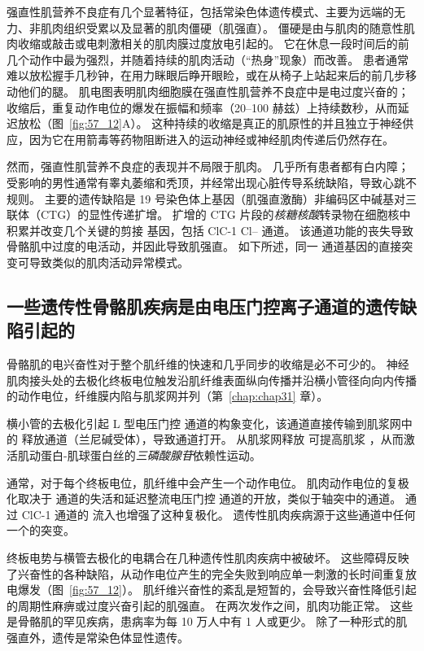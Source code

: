 强直性肌营养不良症有几个显著特征，包括常染色体遗传模式、主要为远端的无力、非肌肉组织受累以及显著的肌肉僵硬（肌强直）。
僵硬是由与肌肉的随意性肌肉收缩或敲击或电刺激相关的肌肉膜过度放电引起的。
它在休息一段时间后的前几个动作中最为强烈，并随着持续的肌肉活动（“热身”现象）而改善。
患者通常难以放松握手几秒钟，在用力眯眼后睁开眼睑，或在从椅子上站起来后的前几步移动他们的腿。
肌电图表明肌肉细胞膜在强直性肌营养不良症中是电过度兴奋的；
收缩后，重复动作电位的爆发在振幅和频率（20–100 赫兹）上持续数秒，从而延迟放松（图~\ref{fig:57_12}A）。
这种持续的收缩是真正的肌原性的并且独立于神经供应，因为它在用箭毒等药物阻断进入的运动神经或神经肌肉传递后仍然存在。


然而，强直性肌营养不良症的表现并不局限于肌肉。
几乎所有患者都有白内障；
受影响的男性通常有睾丸萎缩和秃顶，并经常出现心脏传导系统缺陷，导致心跳不规则。
主要的遗传缺陷是 19 号染色体上基因（肌强直激酶）非编码区中碱基对三联体（CTG）的显性传递扩增。
扩增的 CTG 片段的\textit{核糖核酸}转录物在细胞核中积累并改变几个关键的剪接 基因，包括 ClC-1 Cl– 通道。
该通道功能的丧失导致骨骼肌中过度的电活动，并因此导致肌强直。
如下所述，同一  通道基因的直接突变可导致类似的肌肉活动异常模式。



\subsection{一些遗传性骨骼肌疾病是由电压门控离子通道的遗传缺陷引起的}

骨骼肌的电兴奋性对于整个肌纤维的快速和几乎同步的收缩是必不可少的。
神经肌肉接头处的去极化终板电位触发沿肌纤维表面纵向传播并沿横小管径向向内传播的动作电位，纤维膜内陷与肌浆网并列（第~\ref{chap:chap31} 章）。


横小管的去极化引起 L 型电压门控  通道的构象变化，该通道直接传输到肌浆网中的  释放通道（兰尼碱受体），导致通道打开。
从肌浆网释放  可提高肌浆 ，从而激活肌动蛋白-肌球蛋白丝的\textit{三磷酸腺苷}依赖性运动。


通常，对于每个终板电位，肌纤维中会产生一个动作电位。
肌肉动作电位的复极化取决于  通道的失活和延迟整流电压门控  通道的开放，类似于轴突中的通道。
通过 ClC-1  通道的  流入也增强了这种复极化。
遗传性肌肉疾病源于这些通道中任何一个的突变。


终板电势与横管去极化的电耦合在几种遗传性肌肉疾病中被破坏。
这些障碍反映了兴奋性的各种缺陷，从动作电位产生的完全失败到响应单一刺激的长时间重复放电爆发（图~\ref{fig:57_12}）。
肌纤维兴奋性的紊乱是短暂的，会导致兴奋性降低引起的周期性麻痹或过度兴奋引起的肌强直。
在两次发作之间，肌肉功能正常。
这些是骨骼肌的罕见疾病，患病率为每 10 万人中有 1 人或更少。
除了一种形式的肌强直外，遗传是常染色体显性遗传。


